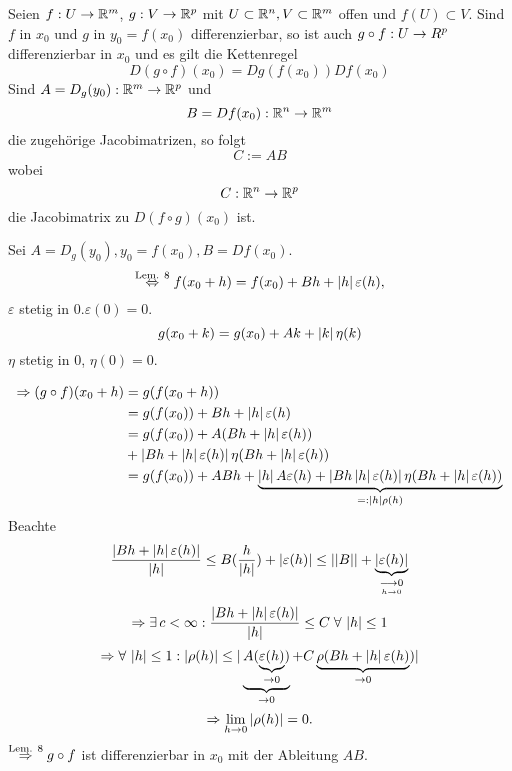 \documentclass[../ana2.tex]{subfiles}
\begin{document}
\begin{satz}[Kettenregel]
    Seien \( f:U\rightarrow \mathbb{R}^m \), 
    \( g:V\rightarrow \mathbb{R}^p \)
    mit \( U \subset \mathbb{R}^n, V \subset \mathbb{R}^m \)
    offen und \( f(U) \subset V \).
    Sind \(f\) in \(x_0\) und \(g\) in \(y_0 = f(x_0)\)
    differenzierbar, so ist auch \(g \circ f:U\rightarrow R^p\)
    differenzierbar in \(x_0\) und es gilt die 
    Kettenregel 
    \[ D(g\circ f)(x_0) = D g(f(x_0))Df(x_0) \]
    Sind \( A = D_g(y_0):\mathbb{R}^m\rightarrow \mathbb{R}^p \) und 
    \[ B = Df(x_0):\mathbb{R}^n\rightarrow \mathbb{R}^m \]
    die zugehörige Jacobimatrizen, so folgt 
    \[ C := AB \]
    wobei
    \[ C:\mathbb{R}^n\rightarrow \mathbb{R}^p \] 
    die Jacobimatrix zu \( D(f \circ g)(x_0) \) ist.
\end{satz}
\begin{bew}
    Sei \(A = D_g(y_0), y_0 = f(x_0), B = Df(x_0) \).
    \[ \overset{\text{Lem. 8}}{\Leftrightarrow} 
    f(x_0 + h) = f(x_0) + Bh + \left|h\right| \varepsilon(h), \]
    \( \varepsilon \) stetig in \(0. \varepsilon(0) = 0\).
    \[ g(x_0 + k) = g(x_0) + Ak + \left|k\right| \eta(k) \]
    \( \eta \) stetig in \( 0 \), \( \eta(0) = 0 \).

    \begin{align*}
        \Rightarrow (g \circ f)(x_0 + h) &= g(f(x_0 + h))\\
        &= g(f(x_0)) + Bh + \left|h\right|\varepsilon(h) \\
        &= g(f(x_0)) + A(Bh + \left|h\right|\varepsilon(h)) \\
        &+ \left| Bh + \left|h\right|\varepsilon(h) \right| \eta (Bh + \left|h\right|\varepsilon(h)) \\
        &= g(f(x_0)) + ABh + \underbrace{\left|h\right| A \varepsilon(h) + \left|Bh \left|h\right|\varepsilon(h)\right| \eta (Bh + \left|h\right|\varepsilon(h))}_{=:\left|h\right|\rho(h)}
    \end{align*}
    Beachte 
    \[ \frac{\left| Bh + \left|h\right|\varepsilon(h) \right|}{\left|h\right|}
    \leq B(\frac{h}{\left|h\right|}) + \left|\varepsilon(h)\right| 
    \leq \left|\left|B\right|\right| + \underbrace{\left|\varepsilon(h)\right|}_{\underset{h \rightarrow 0}{\longrightarrow 0}} \]
    \[ \Rightarrow \exists c < \infty: \frac{\abs{Bh + \abs{h}\varepsilon(h)}}{\abs{h}} 
    \leq C \; \forall \abs{h} \leq 1 \]
    \[ \Rightarrow \forall \abs{h} \leq 1: 
    \abs{\rho(h)} \leq | \underbrace{A(\underbrace{\varepsilon(h)}_{\rightarrow 0})}_{\rightarrow 0} 
    + C\underbrace{\rho (Bh + \abs{h}\varepsilon(h)}_{\rightarrow 0}) | \]    
    \[ \Rightarrow \lim\limits_{h\rightarrow{}0} \left|\rho(h)\right| = 0. \]
    \( \overset{\text{Lem. 8}}{\Rightarrow} g \circ f \) 
    ist differenzierbar in \(x_0\) mit der Ableitung \( AB \).
\end{bew}
\end{document}
